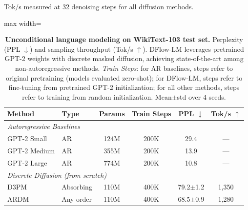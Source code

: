 
\providecommand{\tbd}[1]{#1}
\providecommand{\best}[1]{\textbf{#1}}
\providecommand{\secondbest}[1]{\underline{#1}}

\begin{table}[t]
\centering
\caption{\textbf{Unconditional language modeling on WikiText-103 test set.} Perplexity (PPL $\downarrow$) and sampling throughput (Tok/s $\uparrow$). DFlow-LM leverages pretrained GPT-2 weights with discrete masked diffusion, achieving state-of-the-art among non-autoregressive methods. \textit{Train Steps}: for AR baselines, steps refer to original pretraining (models evaluated zero-shot); for DFlow-LM, steps refer to fine-tuning from pretrained GPT-2 initialization; for all other methods, steps refer to training from random initialization. Mean$\pm$std over 4 seeds.}
\label{tab:main_results}
\vspace{4pt}
{\footnotesize Tok/s measured at 32 denoising steps for all diffusion methods.}
\begin{adjustbox}{max width=\textwidth}
\begin{tabular}{@{}llcccc@{}}
\toprule
\textbf{Method} & \textbf{Type} & \textbf{Params} & \textbf{Train Steps} & \textbf{PPL $\downarrow$} & \textbf{Tok/s $\uparrow$} \\
\midrule
\multicolumn{6}{l}{\textit{Autoregressive Baselines}} \\
GPT-2 Small \citep{radford2019language}   & AR & 124M & 200K & 29.4 & --- \\
GPT-2 Medium \citep{radford2019language}  & AR & 355M & 200K & 13.9 & --- \\
GPT-2 Large \citep{radford2019language}   & AR & 774M & 200K & 10.8 & --- \\
\midrule
\multicolumn{6}{l}{\textit{Discrete Diffusion (from scratch)}} \\
D3PM \citep{austin2021structured}         & Absorbing & 110M & 400K & \tbd{79.2$\pm$1.2} & \tbd{1,350} \\
ARDM \citep{hoogeboom2022autoregressive}  & Any-order  & 110M & 400K & \tbd{68.5$\pm$0.9} & \tbd{1,280} \\

\end{tabular}
\end{adjustbox}
\end{table}
